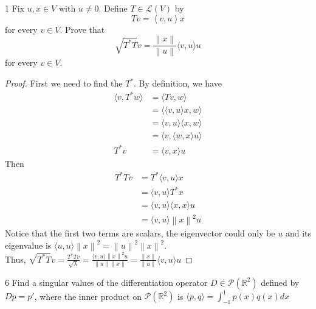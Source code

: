 \documentclass{article}
\newenvironment{problem}[1]{\begin{prob*}{#1}{}}{\end{prob*}}
\begin{document}
\begin{problem}{1}
	Fix $u, x \in V$ with $u \neq 0$. Define $T \in \mathcal{L}(V)$ by \[
		Tv = \left< v, u \right> x
	\]
	for every $v \in V$. Prove that \[
		\sqrt{T^* T}v = \frac{\left\| x \right\|}{\left\| u \right\|} \langle v , u \rangle u
	\] for every $v \in V$.
\end{problem}
\begin{proof}
  First we need to find the $T^*$. By definition, we have
	\begin{equation*}
		\begin{aligned}
			\langle v , T^*w \rangle &= \langle Tv , w \rangle \\
			&= \langle \langle v , u \rangle x , w \rangle \\
			&= \langle v , u \rangle \langle x , w \rangle \\
			&= \langle v , \langle w , x \rangle u \rangle \\
      T^* v &= \langle v , x \rangle u
		\end{aligned}
	\end{equation*}
	Then \begin{equation*}
		\begin{aligned}
		 T^*T v &= T^* \langle v , u \rangle x \\
		 &= \langle v , u \rangle T^* x \\
		 &= \langle v , u \rangle \langle x , x \rangle u \\
		 &= \langle v , u \rangle \left\| x \right\|^{2} u
		\end{aligned}
	\end{equation*}
	Notice that the first two terms are scalars,
	the eigenvector could only be $u$ and its eigenvalue
	is $\langle u , u \rangle \left\| x \right\|^{2} = \left\| u \right\|^{2} \left\| x \right\|^{2}$. \\
	Thus, $\sqrt{T^*T}v = \frac{T^*T v}{\sqrt{\lambda}} = \frac{\langle v , u \rangle\left\| x \right\|^{2} u}{\left\| u \right\|\left\| x \right\|}
	= \frac{\left\| x \right\|}{\left\| u \right\|}\langle v , u \rangle u $
\end{proof}

\begin{problem}{6}
  Find a singular values of the differentiation operator 
  $D \in \mathcal{P}(\mathbb{R}^2)$ defined by $Dp = p'$, where the inner product on
  $\mathcal{P}(\mathbb{R}^2)$ is $\langle p, q \rangle = \int_{-1}^{1} p(x)q(x) dx$
\end{problem}


\end{document}
